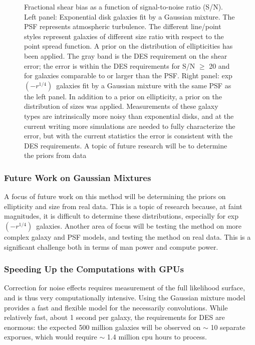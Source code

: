 \documentclass[12pt]{article}
\newcommand{\devprof}{exp$(-r^{1/4})$}
\begin{document}
\begin{figure}[t]
\caption{Fractional shear bias as a function of signal-to-noise ratio (S/N).
Left panel: Exponential disk galaxies fit by a Gaussian mixture.  The PSF
represents atmospheric turbulence.  The different line/point styles represent
galaxies of different size ratio with respect to the point spread function.  A
prior on the distribution of ellipticities has been applied.  The gray band is
the DES requirement on the shear error; the error is within the DES
requirements for S/N $\geq$ 20 and for galaxies comparable to or larger than
the PSF.  Right panel: \devprof\ galaxies fit by a Gaussian mixture with the
same PSF as the left panel. In addition to a prior on ellipticity, a prior on
the distribution of sizes was applied.  Measurements of these galaxy types are
intrinsically more noisy than exponential disks, and at the current writing
more simulations are needed to fully characterize the error, but with the
current statistics the error is consistent with the DES requirements. 
A topic of future research will be to
determine the priors from data 
\label{fig:getgdt}}

\end{figure}

\subsubsection{Future Work on Gaussian Mixtures}

A focus of future work on this method will be determining the priors on
ellipticity and size from real data.  This is a topic of research because, at
faint magnitudes, it is difficult to determine these distributions, especially
for \devprof\ galaxies\cite{Miller12}.  Another area of focus will be testing
the method on more complex galaxy and PSF models, and testing the method on
real data.  This is a significant challenge both in terms of man power and
compute power. 

\subsubsection{Speeding Up the Computations with GPUs} \label{sec:gmix:gpu}

Correction for noise effects requires measurement of the full likelihood
surface, and is thus very computationally intensive.  Using the Gaussian
mixture model provides a fast and flexible model for the necessarily
convolutions.   While relatively fast, about 1 second per galaxy, the
requirements for DES are enormous: the expected 500 million galaxies will be
observed on $\sim$ 10 separate exporues, which would require $\sim$ 1.4 million
cpu hours to process.
\end{document}
